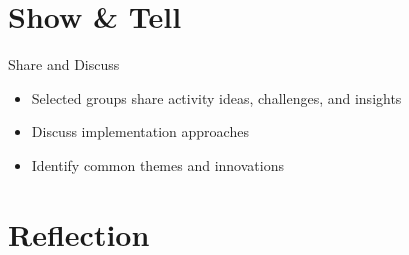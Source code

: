 \documentclass[xcolor={dvipsnames,table}, aspectratio=169]{beamer}
\newcommand{\footername}{AI in Programming Education}
\newcommand{\setfooter}[2]{\renewcommand{\footername}{\href{#2}{#1}}}
\begin{document}
\section{Show \& Tell}
\setfooter{Discussion and Reflection}{https://github.com/neu-ece-esl/ai-prog-workshop}

\begin{frame}{Share and Discuss}
  \begin{itemize}
    \item Selected groups share activity ideas, challenges, and insights
    \item Discuss implementation approaches
    \item Identify common themes and innovations
  \end{itemize}
\end{frame}

\section{Reflection}
\setfooter{Discussion and Reflection}{https://github.com/neu-ece-esl/ai-prog-workshop}

\end{document}
